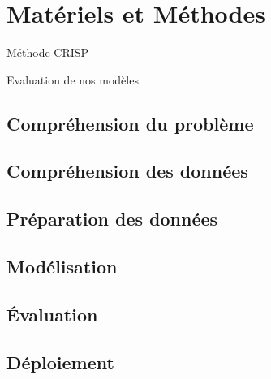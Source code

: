 \chapter{Matériels et Méthodes}

Méthode CRISP\cite{crisp}

Evaluation de nos modèles \cite{plasticc_team_2019_2539456}

\section{Compréhension du problème}
\section{Compréhension des données}
\section{Préparation des données}
\section{Modélisation}
\section{Évaluation}
\section{Déploiement}